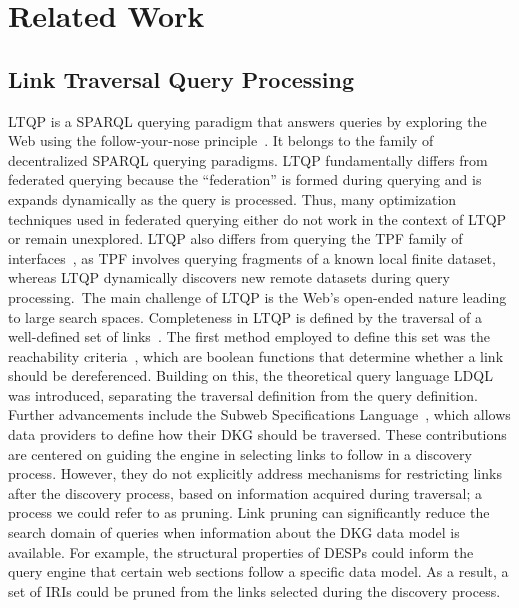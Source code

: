 \section{Related Work}\label{sec:related_work}

\subsection{Link Traversal Query Processing}
LTQP is a SPARQL querying paradigm that answers queries by exploring the Web using the follow-your-nose principle~\cite{hartig2016walking}.
It belongs to the family of decentralized SPARQL querying paradigms.
LTQP fundamentally differs from federated querying because the ``federation'' is formed during querying and is expands dynamically as the query is processed.
Thus, many optimization techniques used in federated querying either do not work in the context of LTQP or remain unexplored.
LTQP also differs from querying the TPF family of interfaces~\cite{azzam2020smart,azzam2021wisekg, DBLP:journals/corr/HartigA16}, as TPF involves querying fragments of a known local finite dataset, whereas LTQP dynamically discovers new remote datasets during query processing.\
The main challenge of LTQP is the Web's open-ended nature leading to large search spaces.
Completeness in LTQP is defined by the traversal of a well-defined set of links~\cite{Hartig2012}.
The first method employed to define this set was the reachability criteria~\cite{Hartig2012}, which are boolean functions that determine whether a link should be dereferenced.
Building on this, the theoretical query language LDQL~\cite{hartigLDQL} was introduced, separating the traversal definition from the query definition.
Further advancements include the Subweb Specifications Language~\cite{Bogaerts2021LinkTW}, which allows data providers to define how their DKG should be traversed.
These contributions are centered on guiding the engine in selecting links to follow in a discovery process.
However, they do not explicitly address mechanisms for restricting links after the discovery process, based on information acquired during traversal; a process we could refer to as pruning.
Link pruning can significantly reduce the search domain of queries when information about the DKG data model is available.
For example, the structural properties of DESPs could inform the query engine that certain web sections follow a specific data model. 
As a result, a set of IRIs could be pruned from the links selected during the discovery process.

